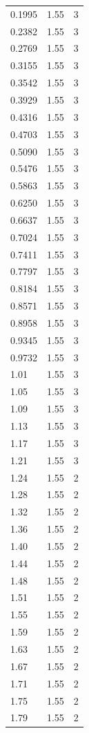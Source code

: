 \begin{longtable}{lrr}
  0.1995 & 1.55 & 3 \\
  0.2382 & 1.55 & 3 \\
  0.2769 & 1.55 & 3 \\
  0.3155 & 1.55 & 3 \\
  0.3542 & 1.55 & 3 \\
  0.3929 & 1.55 & 3 \\
  0.4316 & 1.55 & 3 \\
  0.4703 & 1.55 & 3 \\
  0.5090 & 1.55 & 3 \\
  0.5476 & 1.55 & 3 \\
  0.5863 & 1.55 & 3 \\
  0.6250 & 1.55 & 3 \\
  0.6637 & 1.55 & 3 \\
  0.7024 & 1.55 & 3 \\
  0.7411 & 1.55 & 3 \\
  0.7797 & 1.55 & 3 \\
  0.8184 & 1.55 & 3 \\
  0.8571 & 1.55 & 3 \\
  0.8958 & 1.55 & 3 \\
  0.9345 & 1.55 & 3 \\
  0.9732 & 1.55 & 3 \\
  1.01 & 1.55 & 3 \\
  1.05 & 1.55 & 3 \\
  1.09 & 1.55 & 3 \\
  1.13 & 1.55 & 3 \\
  1.17 & 1.55 & 3 \\
  1.21 & 1.55 & 3 \\
  1.24 & 1.55 & 2 \\
  1.28 & 1.55 & 2 \\
  1.32 & 1.55 & 2 \\
  1.36 & 1.55 & 2 \\
  1.40 & 1.55 & 2 \\
  1.44 & 1.55 & 2 \\
  1.48 & 1.55 & 2 \\
  1.51 & 1.55 & 2 \\
  1.55 & 1.55 & 2 \\
  1.59 & 1.55 & 2 \\
  1.63 & 1.55 & 2 \\
  1.67 & 1.55 & 2 \\
  1.71 & 1.55 & 2 \\
  1.75 & 1.55 & 2 \\
  1.79 & 1.55 & 2 \\

\end{longtable}
